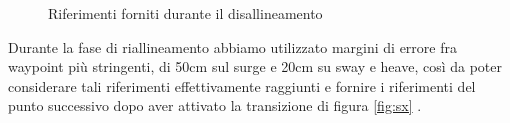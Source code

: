\documentclass{article}
\begin{document}
            \begin{figure} [ht]
                \caption{Riferimenti forniti durante il disallineamento}
                \label{fig:emerge}
            \end{figure}

            Durante la fase di riallineamento abbiamo utilizzato
            margini di errore fra waypoint più stringenti, di 50cm sul surge e 20cm 
            su sway e heave, così da poter considerare tali riferimenti effettivamente raggiunti e fornire i riferimenti del punto successivo dopo aver attivato la transizione
            di figura \ref{fig:sx} .         
\end{document}
